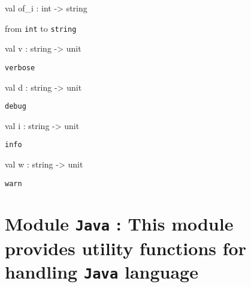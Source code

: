 \documentclass[11pt]{article}
\begin{document}
\label{val:Log.of-underscorei}\begin{ocamldoccode}
val of_i : int -> string
\end{ocamldoccode}
\begin{ocamldocdescription}
from {\tt{int}} to {\tt{string}}


\end{ocamldocdescription}




\label{val:Log.v}\begin{ocamldoccode}
val v : string -> unit
\end{ocamldoccode}
\begin{ocamldocdescription}
{\tt{verbose}}


\end{ocamldocdescription}




\label{val:Log.d}\begin{ocamldoccode}
val d : string -> unit
\end{ocamldoccode}
\begin{ocamldocdescription}
{\tt{debug}}


\end{ocamldocdescription}




\label{val:Log.i}\begin{ocamldoccode}
val i : string -> unit
\end{ocamldoccode}
\begin{ocamldocdescription}
{\tt{info}}


\end{ocamldocdescription}




\label{val:Log.w}\begin{ocamldoccode}
val w : string -> unit
\end{ocamldoccode}
\begin{ocamldocdescription}
{\tt{warn}}


\end{ocamldocdescription}


\section{Module {\tt{Java}} : This module provides utility functions for handling {\tt{Java}} language}
\label{module:Java}
\end{document}
